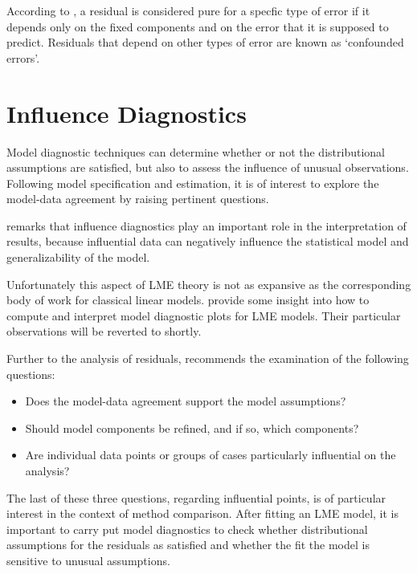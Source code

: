 \documentclass[12pt, a4paper]{report}
\theoremstyle{definition}
\theoremstyle{remark}
\begin{document}
According to \citet{hilden1995}, a residual is considered pure for a specfic type of error if it depends only on the fixed components and on the error that it is supposed to predict. Residuals that depend on other types of error are known as `confounded errors'.





%
%



\section{Influence Diagnostics}
Model diagnostic techniques can determine whether or not the distributional assumptions are satisfied, but also to assess the influence of unusual observations. Following model specification and estimation, it is of interest to explore the model-data agreement by raising pertinent questions. 

\citet{west} remarks that influence diagnostics play an important role in the interpretation of results, because influential data can negatively influence the statistical model and generalizability of the model. 
 

Unfortunately this aspect of LME theory is not as expansive as the corresponding body of work for classical linear models. \citet{PB} provide some insight into how to compute and interpret model diagnostic plots for LME models. Their particular observations will be reverted to shortly. 

Further to the analysis of residuals, \citet{schabenberger} recommends the examination of the following questions:
\begin{itemize}
\item Does the model-data agreement support the model assumptions?
\item Should model components be refined, and if so, which components? 
\item Are individual data points or groups of cases particularly
influential on the analysis?
\end{itemize}
The last of these three questions, regarding influential points, is of particular interest in the context of method comparison. After fitting an LME model, it is important to carry put model diagnostics to check whether distributional assumptions for the residuals as satisfied and whether the fit the model is sensitive to unusual assumptions. 
\end{document}
